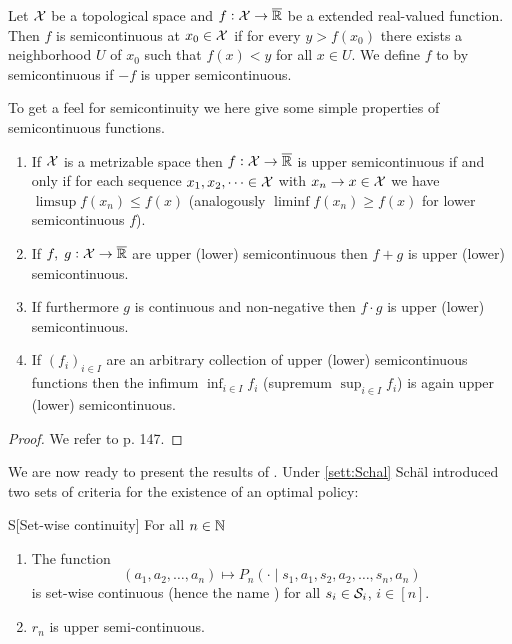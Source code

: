 \begin{defn}[Semicontinuity]
  Let $\mathcal{X}$ be a topological space and $f : \mathcal{X} \to \overline{\mathbb{R}}$ be a
  extended real-valued function.
  Then $f$ is  semicontinuous
  at $x_0 \in \mathcal{X}$ if for every $y > f(x_0)$ there exists a neighborhood
  $U$ of $x_0$ such that $f(x) < y$ for all $x \in U$.
  We define $f$ to by  semicontinuous if
  $-f$ is upper semicontinuous.
\end{defn}
To get a feel for semicontinuity we here
give some simple properties of semicontinuous functions.
\begin{prop}
  \leavevmode
  \begin{enumerate}
    \item If $\mathcal{X}$ is a metrizable space then
      $f : \mathcal{X} \to \overline{\mathbb{R}}$ is upper semicontinuous if and only
      if for each sequence $x_1, x_2, \dots \in \mathcal{X}$
      with $x_n \to x \in \mathcal{X}$ we have $\limsup f(x_n) \leq f(x)$
      (analogously $\liminf f(x_n) \geq f(x)$ for lower semicontinuous $f$).
    \item If $f,\; g : \mathcal{X} \to \overline{\mathbb{R}}$ are upper (lower) semicontinuous then
      $f + g$ is upper (lower) semicontinuous.
    \item If furthermore $g$ is continuous and non-negative then
      $f \cdot g$ is upper (lower) semicontinuous.
    \item If $(f_i)_{i \in I}$ are an arbitrary collection of upper (lower)
      semicontinuous functions then the infimum $\inf_{i \in I} f_i$
      (supremum $\sup_{i \in I} f_i$) is again upper (lower) semicontinuous.
  \end{enumerate}
  \label{prop:sumProdSemiC}
\end{prop}
\begin{proof}
  We refer to  p. 147.
\end{proof}

We are now ready to present the results of .
Under \cref{sett:Schal} Schäl introduced two sets of criteria for the existence
of an optimal policy:

\begin{cond}{S}[Set-wise continuity]
  For all $n \in \mathbb{N}$ 
  \begin{enumerate}
    \item The function \[
	(a_1, a_2, \dots, a_n) \mapsto
	P_n(\cdot \mid s_1, a_1, s_2, a_2, \dots, s_n, a_n)
      \]
      is set-wise continuous (hence the name )
      for all $s_i \in \mathcal{S}_i$, $i \in [n]$.
    \item $r_n$ is upper semi-continuous.
  \end{enumerate}
  \label{cond:S}
\end{cond}

